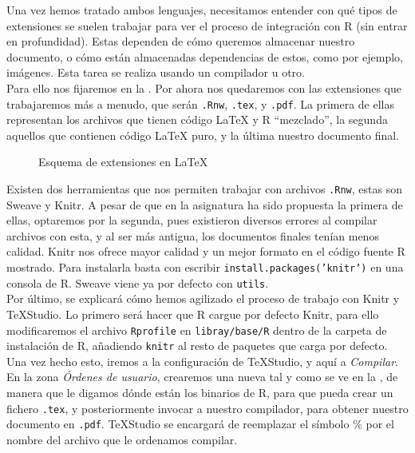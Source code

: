 \documentclass[12pt]{report}\usepackage[]{graphicx}\usepackage[dvipsnames]{xcolor}
\begin{document}
			Una vez hemos tratado ambos lenguajes, necesitamos entender con qué tipos de extensiones se suelen trabajar para ver el proceso de integración con R (sin entrar en profundidad). Estas dependen de cómo queremos almacenar nuestro documento, o cómo están almacenadas dependencias de estos, como por ejemplo, imágenes. Esta tarea se realiza usando un compilador u otro. \\
			
			Para ello nos fijaremos en la . Por ahora nos quedaremos con las extensiones que trabajaremos más a menudo, que serán \texttt{.Rnw}, \texttt{.tex}, y \texttt{.pdf}. La primera de ellas representan los archivos que tienen código \LaTeX{} y R ``mezclado'', la segunda aquellos que contienen código \LaTeX{} puro, y la última nuestro documento final. \\
			
			\begin{figure}[H]
				\centering
				\caption{Esquema de extensiones en \LaTeX}
				\label{fig:extensiones}
			\end{figure}
			
			Existen dos herramientas que nos permiten trabajar con archivos \texttt{.Rnw}, estas son Sweave y Knitr. A pesar de que en la asignatura ha sido propuesta la primera de ellas, optaremos por la segunda, pues existieron diversos errores al compilar archivos con esta, y al ser más antigua, los documentos finales tenían menos calidad. Knitr nos ofrece mayor calidad y un mejor formato en el código fuente R mostrado. Para instalarla basta con escribir \texttt{install.packages('knitr')} en una consola de R. Sweave viene ya por defecto con \texttt{utils}. \\
			
			Por último, se explicará cómo hemos agilizado el proceso de trabajo con Knitr y \TeX{}Studio. Lo primero será hacer que R cargue por defecto Knitr, para ello modificaremos el archivo \texttt{Rprofile} en \texttt{libray/base/R} dentro de la carpeta de instalación de R, añadiendo \texttt{knitr} al resto de paquetes que carga por defecto. Una vez hecho esto, iremos a la configuración de \TeX{}Studio, y aquí a \textit{Compilar}. En la zona \textit{Órdenes de usuario}, crearemos una nueva tal y como se ve en la , de manera que le digamos dónde están los binarios de R, para que pueda crear un fichero \texttt{.tex}, y posteriormente invocar a nuestro compilador, para obtener nuestro documento en \texttt{.pdf}. \TeX{}Studio se encargará de reemplazar el símbolo \% por el nombre del archivo que le ordenamos compilar. 
			
\end{document}
